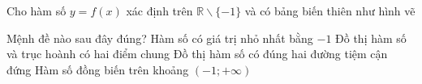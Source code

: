 \begin{ex}%
Cho hàm số $y=f(x)$ xác định trên $\mathbb R\backslash\{-1\}$ và có bảng biến thiên như hình vẽ
\begin{center}
\end{center}
Mệnh đề nào sau đây đúng?
\choice
{Hàm số có giá trị nhỏ nhất bằng $-1$}
{\True Đồ thị hàm số và trục hoành có hai điểm chung}
{Đồ thị hàm số có đúng hai đường tiệm cận đứng}
{Hàm số đồng biến trên khoảng $(-1;+\infty)$}
\end{ex}

